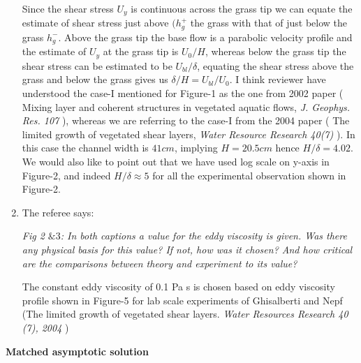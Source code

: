 \documentclass[letterpaper,10pt]{article}
\begin{document}
\begin{enumerate}
Since the shear stress $U_y$ is continuous across the grass tip we can equate the estimate of shear stress just above $(h_g^+$ the grass with that of just below the grass $h_g^{-}$. 
Above the grass tip the base flow is a parabolic velocity profile and the estimate of $U_y$ at the grass tip is $U_0/H$, whereas below the grass tip the shear stress can be estimated to be $U_{bl}/\delta$, equating the shear stress above the grass and below the grass gives us $\delta/H = U_{bl}/U_0$.
I think reviewer have understood the case-I mentioned for Figure-1 as the one from 2002 paper ( Mixing layer and coherent structures in vegetated aquatic flows, \textit{J. Geophys. Res. 107} ), whereas we are referring to the case-I from the 2004 paper ( The limited growth of vegetated shear layers, \textit{Water Resource Research 40(7)} ). In this case the channel width is $41cm$, implying $H=20.5 cm$ hence $H/\delta=4.02$. We would also like to point out that we have used log scale on y-axis in Figure-2, and indeed $H/\delta \approx 5$ for all the experimental observation shown in Figure-2.


\item The referee says:

\textit{  Fig 2 $\& 3$:
In both captions a value for the eddy viscosity is given. Was there any
physical basis for this value? If not, how was it chosen? And how critical
are the comparisons between theory and experiment to its value?
}

The constant eddy viscosity of 0.1 Pa s is chosen based on eddy viscosity profile shown in Figure-5 for lab scale experiments of Ghisalberti and Nepf (The limited growth of vegetated shear layers. \textit{Water Resources Research 40 (7), 2004} )



\end{enumerate}

\newpage
\centerline{\textbf{Matched asymptotic solution}}
\end{document}

